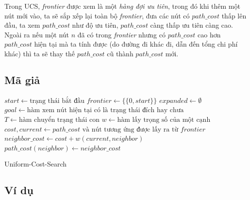 Trong UCS, \textit{frontier} được xem là một \textit{hàng đợi ưu tiên}, trong đó khi thêm một nút mới vào, ta sẽ sắp xếp lại toàn bộ \textit{frontier}, đưa các nút có $path\_cost$ thấp lên đầu, ta xem $path\_cost$ như độ ưu tiên, $path\_cost$ càng thấp ưu tiên càng cao. Ngoài ra nếu một nút $n$ đã có trong \textit{frontier} nhưng có $path\_cost$ cao hơn $path\_cost$ hiện tại mà ta tính được (do đường đi khác đi, dẫn đến tổng chi phí khác) thì ta sẽ thay thế $path\_cost$ cũ thành $path\_cost$ mới.

\subsection{Mã giả}

\begin{algorithm}[H]
  $start \gets \text{trạng thái bắt đầu}$\;
  $frontier \gets \{\{0, start\}\}$\; 
  $expanded \gets \emptyset$\;
  $goal \gets \text{hàm xem nút hiện tại có là trạng thái đích hay chưa}$\;
  $T \gets \text{hàm chuyển trạng thái con}$\;
  $w \gets \text{hàm lấy trọng số của một cạnh}$\;
  {
      $cost, current \gets \text{$path\_cost$ và nút tương ứng được lấy ra từ $frontier$}$\;
      \;
      {
        \;
      }{
        {
            $neighbor\_cost \gets cost + w(current, neighbor)$\;
            {
                \;
            }
            {
                $path\_cost(neighbor) \gets neighbor\_cost$
            }
        }
      }
  }
  \;
  \caption{Uniform-Cost-Search}
  \label{algo:UCS}
\end{algorithm}

\subsection{Ví dụ}

